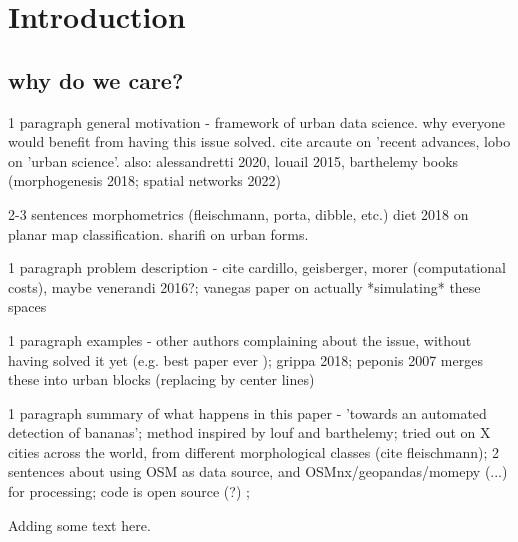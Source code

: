 \section{Introduction}
\label{sec:intro}

\subsection{why do we care?}

1 paragraph general motivation - framework of urban data science. why everyone would benefit from having this issue solved. cite arcaute on 'recent advances, lobo on 'urban science'. also: alessandretti 2020, louail 2015, barthelemy books (morphogenesis 2018; spatial networks 2022)

2-3 sentences morphometrics (fleischmann, porta, dibble, etc.) diet 2018 on planar map classification. sharifi on urban forms.

1 paragraph problem description - cite cardillo, geisberger, morer (computational costs), maybe venerandi 2016?; vanegas paper on actually *simulating* these spaces

1 paragraph examples - other authors complaining about the issue, without having solved it yet (e.g. best paper ever \cite{vybornova2022automated}); grippa 2018; peponis 2007 merges these into urban blocks (replacing by center lines)

1 paragraph summary of what happens in this paper - 'towards an automated detection of bananas';
method inspired by louf and barthelemy;
tried out on X cities across the world,
from different morphological classes (cite fleischmann);
2 sentences about using OSM as data source, and OSMnx/geopandas/momepy (...) for processing;
code is open source (?) ;

Adding some text here.